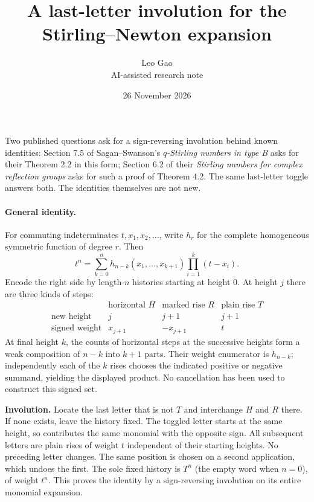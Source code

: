 \documentclass[11pt]{article}
\title{A last-letter involution for the Stirling--Newton expansion}
\author{Leo Gao\\\small AI-assisted research note}
\date{26 November 2026}
\begin{document}
\maketitle
\noindent Two published questions ask for a sign-reversing involution behind known identities: Section 7.5 of Sagan--Swanson's \emph{$q$-Stirling numbers in type B} asks for their Theorem 2.2 in this form; Section 6.2 of their \emph{Stirling numbers for complex reflection groups} asks for such a proof of Theorem 4.2. The same last-letter toggle answers both. The identities themselves are not new.
\paragraph{General identity.} For commuting indeterminates $t,x_1,x_2,\ldots$, write $h_r$ for the complete homogeneous symmetric function of degree $r$. Then
\[
t^n=\sum_{k=0}^n h_{n-k}(x_1,\ldots,x_{k+1})\prod_{i=1}^k(t-x_i).
\]
Encode the right side by length-$n$ histories starting at height $0$. At height $j$ there are three kinds of steps:
\[
\begin{array}{c|ccc}
&\text{horizontal }H&\text{marked rise }R&\text{plain rise }T\\\hline
\text{new height}&j&j+1&j+1\\
\text{signed weight}&x_{j+1}&-x_{j+1}&t
\end{array}
\]
At final height $k$, the counts of horizontal steps at the successive heights form a weak composition of $n-k$ into $k+1$ parts. Their weight enumerator is $h_{n-k}$; independently each of the $k$ rises chooses the indicated positive or negative summand, yielding the displayed product. No cancellation has been used to construct this signed set.
 
\medskip\noindent\textbf{Involution.} Locate the last letter that is not $T$ and interchange $H$ and $R$ there. If none exists, leave the history fixed. The toggled letter starts at the same height, so contributes the same monomial with the opposite sign. All subsequent letters are plain rises of weight $t$ independent of their starting heights. No preceding letter changes. The same position is chosen on a second application, which undoes the first. The sole fixed history is $T^n$ (the empty word when $n=0$), of weight $t^n$. This proves the identity by a sign-reversing involution on its entire monomial expansion.
\end{document}
